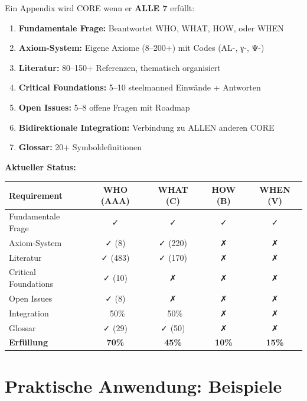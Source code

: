 \documentclass[12pt,a4paper]{article}
\begin{document}
\begin{tcolorbox}[colback=red!5!white, colframe=red!75!black, 
    title=Die 7 CORE-Anforderungen (zusätzlich zum Standard)]

Ein Appendix wird CORE wenn er \textbf{ALLE 7} erfüllt:

\begin{enumerate}
\item \textbf{Fundamentale Frage:} Beantwortet WHO, WHAT, HOW, oder WHEN
\item \textbf{Axiom-System:} Eigene Axiome (8--200+) mit Codes (AL-, γ-, Ψ-)
\item \textbf{Literatur:} 80--150+ Referenzen, thematisch organisiert
\item \textbf{Critical Foundations:} 5--10 steelmanned Einwände + Antworten
\item \textbf{Open Issues:} 5--8 offene Fragen mit Roadmap
\item \textbf{Bidirektionale Integration:} Verbindung zu ALLEN anderen CORE
\item \textbf{Glossar:} 20+ Symboldefinitionen
\end{enumerate}

\textbf{Aktueller Status:}
\begin{center}
\begin{tabular}{@{}lcccc@{}}
\toprule
Requirement & WHO (AAA) & WHAT (C) & HOW (B) & WHEN (V) \\
\midrule
Fundamentale Frage & ✓ & ✓ & ✓ & ✓ \\
Axiom-System & ✓ (8) & ✓ (220) & ✗ & ✗ \\
Literatur & ✓ (483) & ✓ (170) & ✗ & ✗ \\
Critical Foundations & ✓ (10) & ✗ & ✗ & ✗ \\
Open Issues & ✓ (8) & ✗ & ✗ & ✗ \\
Integration & ~50\% & ~50\% & ✗ & ✗ \\
Glossar & ✓ (29) & ✓ (50) & ✗ & ✗ \\
\midrule
\textbf{Erfüllung} & \textbf{70\%} & \textbf{45\%} & \textbf{10\%} & \textbf{15\%} \\
\bottomrule
\end{tabular}
\end{center}

\end{tcolorbox}

\section{Praktische Anwendung: Beispiele}
\end{document}
